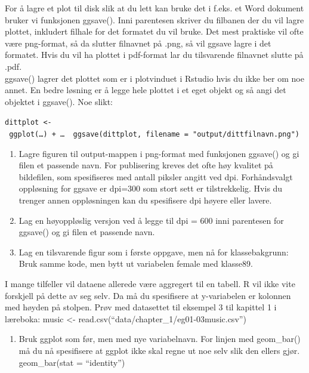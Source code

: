 \documentclass[
  letterpaper,
  DIV=11,
  numbers=noendperiod]{scrreprt}
\providecommand{\tightlist}{%
  \setlength{\itemsep}{0pt}\setlength{\parskip}{0pt}}\usepackage{longtable,booktabs,array}
\begin{document}
For å lagre et plot til disk slik at du lett kan bruke det i f.eks. et
Word dokument bruker vi funksjonen ggsave(). Inni parentesen skriver du
filbanen der du vil lagre plottet, inkludert filhale for det formatet du
vil bruke. Det mest praktiske vil ofte være png-format, så da slutter
filnavnet på .png, så vil ggsave lagre i det formatet. Hvis du vil ha
plottet i pdf-format lar du tilsvarende filnavnet slutte på .pdf.\\
ggsave() lagrer det plottet som er i plotvinduet i Rstudio hvis du ikke
ber om noe annet. En bedre løsning er å legge hele plottet i et eget
objekt og så angi det objektet i ggsave(). Noe slikt:

\texttt{dittplot\ \textless{}-\ ggplot(…)\ +\ …\ \ ggsave(dittplot,\ filename\ =\ "output/dittfilnavn.png")}

\begin{enumerate}
\def\labelenumi{\arabic{enumi}.}
\setcounter{enumi}{11}
\item
  Lagre figuren til output-mappen i png-format med funksjonen ggsave()
  og gi filen et passende navn. For publisering kreves det ofte høy
  kvalitet på bildefilen, som spesifiseres med antall piksler angitt ved
  dpi. Forhåndsvalgt oppløsning for ggsave er dpi=300 som stort sett er
  tilstrekkelig. Hvis du trenger annen oppløsningen kan du spesifisere
  dpi høyere eller lavere.
\item
  Lag en høyoppløslig versjon ved å legge til dpi = 600 inni parentesen
  for ggsave() og gi filen et passende navn.
\item
  Lag en tilsvarende figur som i første oppgave, men nå for
  klassebakgrunn: Bruk samme kode, men bytt ut variabelen female med
  klasse89.
\end{enumerate}

I mange tilfeller vil dataene allerede være aggregert til en tabell. R
vil ikke vite forskjell på dette av seg selv. Da må du spesifisere at
y-variabelen er kolonnen med høyden på stolpen. Prøv med datasettet til
eksempel 3 til kapittel 1 i læreboka: music \textless-
read.csv(``data/chapter\_1/eg01-03music.csv'')

\begin{enumerate}
\def\labelenumi{\arabic{enumi}.}
\setcounter{enumi}{14}
\tightlist
\item
  Bruk ggplot som før, men med nye variabelnavn. For linjen med
  geom\_bar() må du nå spesifisere at ggplot ikke skal regne ut noe selv
  slik den ellers gjør. geom\_bar(stat = ``identity'')
\end{enumerate}
\end{document}
